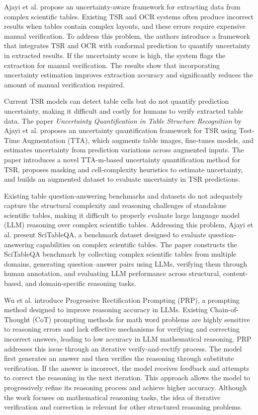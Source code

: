 \documentclass[12pt]{article}
\begin{document}
Ajayi et al. \cite{ajayi2025uncertaintyawarecomplexscientifictable} propose an uncertainty-aware framework for extracting data from complex scientific tables. Existing TSR and OCR systems often produce incorrect results when tables contain complex layouts, and these errors require expensive manual verification. To address this problem, the authors introduce a framework that integrates TSR and OCR with conformal prediction to quantify uncertainty in extracted results. If the uncertainty score is high, the system flags the extraction for manual verification. The results show that incorporating uncertainty estimation improves extraction accuracy and significantly reduces the amount of manual verification required.

Current TSR models can detect table cells but do not quantify prediction uncertainty, making it difficult and costly for humans to verify extracted table data. The paper \textit{Uncertainty Quantification in Table Structure Recognition} by Ajayi et al. \cite{ajayi2024uncertaintyquantificationtablestructure} proposes an uncertainty quantification framework for TSR using Test-Time Augmentation (TTA), which augments table images, fine-tunes models, and estimates uncertainty from prediction variations across augmented inputs. The paper introduces a novel TTA-m-based uncertainty quantification method for TSR, proposes masking and cell-complexity heuristics to estimate uncertainty, and builds an augmented dataset to evaluate uncertainty in TSR predictions.

Existing table question-answering benchmarks and datasets do not adequately capture the structural complexity and reasoning challenges of standalone scientific tables, making it difficult to properly evaluate large language model (LLM) reasoning over complex scientific tables. Addressing this problem, Ajayi et al. \cite{Ajayi2025SciTableQAAQ} present SciTableQA, a benchmark dataset designed to evaluate question-answering capabilities on complex scientific tables. The paper constructs the SciTableQA benchmark by collecting complex scientific tables from multiple domains, generating question--answer pairs using LLMs, verifying them through human annotation, and evaluating LLM performance across structural, content-based, and domain-specific reasoning tasks.

Wu et al. \cite{wu2023mathprogressiverectificationprompting} introduce Progressive Rectification Prompting (PRP), a prompting method designed to improve reasoning accuracy in LLMs. Existing Chain-of-Thought (CoT) prompting methods for math word problems are highly sensitive to reasoning errors and lack effective mechanisms for verifying and correcting incorrect answers, leading to low accuracy in LLM mathematical reasoning. PRP addresses this issue through an iterative verify-and-rectify process. The model first generates an answer and then verifies the reasoning through substitute verification. If the answer is incorrect, the model receives feedback and attempts to correct the reasoning in the next iteration. This approach allows the model to progressively refine its reasoning process and achieve higher accuracy. Although the work focuses on mathematical reasoning tasks, the idea of iterative verification and correction is relevant for other structured reasoning problems.
\end{document}
